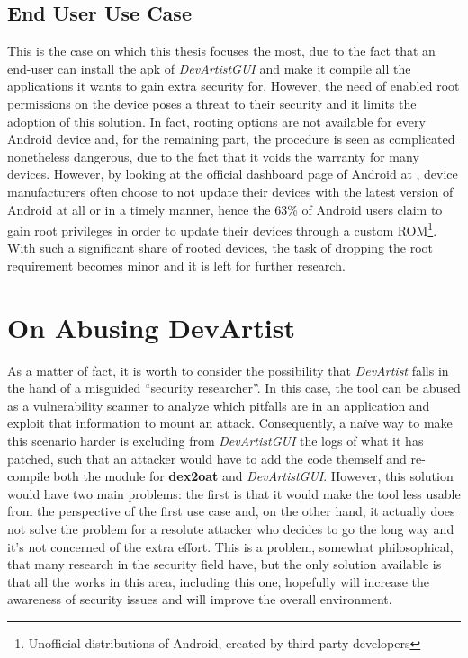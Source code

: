 \subsection{End User Use Case}
This is the case on which this thesis focuses the most, due to the fact that an end-user can install the apk of \emph{DevArtistGUI} and make it compile all the applications it wants to gain extra security for. However, the need of enabled root permissions on the device poses a threat to their security and it limits the adoption of this solution. In fact, rooting options are not available for every Android device and, for the remaining part, the procedure is seen as complicated nonetheless dangerous, due to the fact that it voids the warranty for many devices. However, by looking at the official dashboard page of Android at \cite{anddash}, device manufacturers often choose to not update their devices with the latest version of Android at all or in a timely manner, hence the 63\%\cite{muchroot} of Android users claim to gain root privileges in order to update their devices through a custom ROM\footnote{Unofficial distributions of Android, created by third party developers}. With such a significant share of rooted devices, the task of dropping the root requirement becomes minor and it is left for further research. 

\section{On Abusing DevArtist}
As a matter of fact, it is worth to consider the possibility that \emph{DevArtist} falls in the hand of a misguided \enquote{security researcher}. In this case, the tool can be abused as a vulnerability scanner to analyze which pitfalls are in an application and exploit that information to mount an attack. Consequently, a na\"ive way to make this scenario harder is excluding from \emph{DevArtistGUI} the logs of what it has patched, such that an attacker would have to add the code themself and re-compile both the module for \textbf{dex2oat} and \emph{DevArtistGUI}. However, this solution would have two main problems: the first is that it would make the tool less usable from the perspective of the first use case and, on the other hand, it actually does not solve the problem for a resolute attacker who decides to go the long way and it's not concerned of the extra effort. This is a problem, somewhat philosophical, that many research in the security field have, but the only solution available is that all the works in this area, including this one, hopefully will increase the awareness of security issues and will improve the overall environment.


